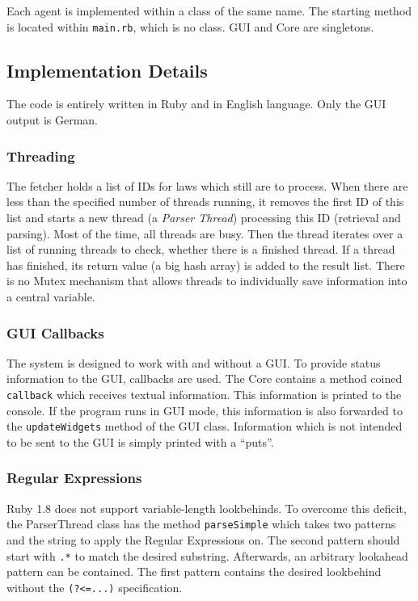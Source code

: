 \documentclass{scrartcl}
\begin{document}
Each agent is implemented within a class of the same name. The starting method is located within \texttt{main.rb}, which is no class. GUI and Core are singletons.

\subsection{Implementation Details}
The code is entirely written in Ruby and in English language. Only the GUI output is German.

\subsubsection{Threading}
\label{sec:threading}
The fetcher holds a list of IDs for laws which still are to process. When there are less than the specified number of threads running, it removes the first ID of this list and starts a new thread (a \textit{Parser Thread}) processing this ID (retrieval and parsing). Most of the time, all threads are busy. Then the thread iterates over a list of running threads to check, whether there is a finished thread. If a thread has finished, its return value (a big hash array) is added to the result list. There is no Mutex mechanism that allows threads to individually save information into a central variable.

\subsubsection{GUI Callbacks}
The system is designed to work with and without a GUI. To provide status information to the GUI, callbacks are used. The Core contains a method coined \texttt{callback} which receives textual information. This information is printed to the console. If the program runs in GUI mode, this information is also forwarded to the \texttt{updateWidgets} method of the GUI class. Information which is not intended to be sent to the GUI is simply printed with a ``puts''.

\subsubsection{Regular Expressions}
Ruby 1.8 does not support variable-length lookbehinds. To overcome this deficit, the ParserThread class has the method \texttt{parseSimple} which takes two patterns and the string to apply the Regular Expressions on. The second pattern should start with \texttt{.*} to match the desired substring. Afterwards, an arbitrary lookahead pattern can be contained. The first pattern contains the desired lookbehind without the \texttt{(?<=...)} specification.
\end{document}
